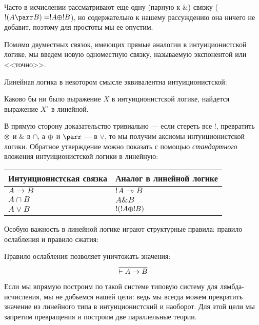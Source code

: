 Часто в исчислении рассматривают еще одну (парную к $\&$) связку ($!(A\parr B) = !A\varoplus !B$), 
но содержательно к нашему рассуждению она ничего не добавит, поэтому для простоты мы ее
опустим.

Помимо двуместных связок, имеющих прямые аналогии в интуиционистской логике, мы введем новую
одноместную связку, называемую экспонентой или <<точно>>.

Линейная логика в некотором смысле эквивалентна интуиционистской:
\begin{theorem}
Каково бы ни было выражение $X$ в интуиционистской логике, найдется выражение $X^\circ$
в линейной.
\end{theorem}

В прямую сторону доказательство тривиально --- если стереть все $!$, 
превратить $\varotimes$ и $\&$ в $\cap$, а $\varoplus$ и $\parr$ --- в $\vee$, 
то мы получим аксиомы интуиционистской логики.
Обратное утверждение можно показать с помощью \emph{стандартного} вложения интуиционистской логики
в линейную:

\begin{tabular}{ll}
Интуиционистская связка & Аналог в линейной логике \\
\hline
$A \rightarrow B$ & $!A \multimap B$\\
$A \cap B$ & $A \& B$\\
$A \vee B$ & $!(!A \varoplus !B)$
\end{tabular}

Особую важность в линейной логике играют структурные правила: правило ослабления и правило 
сжатия:

Правило ослабления позволяет уничтожать значения:
$$\infer{\vdash A\rightarrow B}{}$$

Если мы впрямую построим по такой системе типовую систему для лямбда-исчисления, мы
не добьемся нашей цели: ведь мы всегда можем превратить значение из линейного типа
в интуиционистский и наоборот. 
Для этой цели мы запретим превращения и построим две параллельные теории.